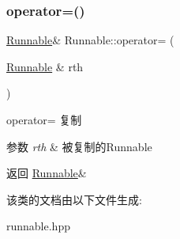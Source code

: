 \subsubsection{\texorpdfstring{operator=()}{operator=()}\hspace{0.1cm}{\footnotesize\ttfamily [2/2]}}
{\footnotesize\ttfamily \hyperlink{classRunnable}{Runnable}\& Runnable\+::operator= (\begin{DoxyParamCaption}\item[{\hyperlink{classRunnable}{Runnable} \&}]{rth }\end{DoxyParamCaption})\hspace{0.3cm}{\ttfamily [inline]}}



operator= 复制 


\begin{DoxyParams}{参数}
{\em rth} & 被复制的\+Runnable\\
\hline
\end{DoxyParams}
\begin{DoxyReturn}{返回}
\hyperlink{classRunnable}{Runnable}\& 
\end{DoxyReturn}


该类的文档由以下文件生成\+:\begin{DoxyCompactItemize}
\item 
runnable.\+hpp\end{DoxyCompactItemize}

